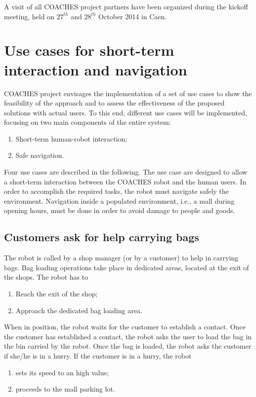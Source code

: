A visit of all COACHES project partners have been organized during the kickoff meeting,
held on $27^{th}$ and $28^{th}$ October 2014 in Caen. 


\section{Use cases for short-term interaction and navigation}

COACHES project envisages the implementation of a set of use cases
to show the feasibility of the approach and to assess the effectiveness
of the proposed solutions with actual users.
To this end, different use cases will be implemented, focusing on two main
components of the entire system:
\begin{enumerate}
\item Short-term human-robot interaction;
\item Safe navigation.
\end{enumerate}

Four use cases are described in the following. The use case are designed
to allow a short-term interaction between the COACHES robot and the human users.
In order to accomplish the required tasks, the robot must navigate
safely the environment. Navigation inside a populated environment, i.e., a mall
during opening hours, must be done in order to avoid damage to people
and goods.


\subsection{Customers ask for help carrying bags}

The robot is called by a shop manager (or by a customer) to help
in carrying bags. Bag loading operations take place in dedicated areas,
located at the exit of the shops.
The robot has to
\begin{enumerate}
\item Reach the exit of the shop;
\item Approach the dedicated bag loading area.
\end{enumerate}

\noindent When in position, the robot waits for the customer to establish
a contact.
Once the customer has established a contact, the robot asks the user
to load the bag in the bin carried by the robot.
Once the bag is loaded, the robot asks the customer if she/he is in a hurry.
If the customer is in a hurry, the robot
\begin{enumerate}
\item sets its speed to an high value;
\item proceeds to the mall parking lot.
\end{enumerate}

